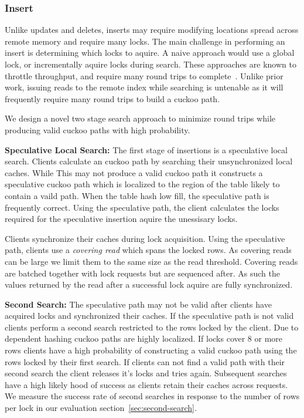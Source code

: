\subsubsection{Insert}

Unlike updates and deletes, inserts may require modifying
locations spread across remote memory and require many
locks. The main challenge in performing an insert is
determining which locks to aquire. A naive approach would
use a global lock, or incrementally aquire locks during
search. These approaches are known to throttle throughput,
and require many round trips to
complete~\cite{cuckoo-improvements}. Unlike prior work,
issuing reads to the remote index while searching is
untenable as it will frequently require many round trips to
build a cuckoo path.

We design a novel two stage search approach to minimize
round trips while producing valid cuckoo paths with high
probability.

\textbf{Speculative Local Search:} The first stage of
insertions is a speculative local search. Clients calculate
an cuckoo path by searching their unsynchronized local
caches. While This may not produce a valid cuckoo path it
constructs a speculative cuckoo path which is localized to
the region of the table likely to contain a vaild path. When
the table hash low fill, the speculative path is frequently
correct. Using the speculative path, the client calculates
the locks required for the speculative insertion aquire the
unessisary locks.

Clients synchronize their caches during lock acquisition.
Using the speculative path, clients use a \textit{covering
read} which spans the locked rows. As covering reads can be
large we limit them to the same size as the read threshold.
Covering reads are batched together with lock requests but
are sequenced after. As such the values returned by the read
after a successful lock aquire are fully synchronized.

\textbf{Second Search:} The speculative path may not be
valid after clients have acquired locks and synchronized
their caches. If the speculative path is not valid clients
perform a second search restricted to the rows locked by the
client. Due to dependent hashing cuckoo paths are highly
localized. If locks cover 8 or more rows clients have a high
probability of constructing a valid cuckoo path using the
rows locked by their first search. If clients can not find a
valid path with their second search the client releases it's
locks and tries again. Subsequent searches have a high
likely hood of success as clients retain their caches across
requests. We measure the success rate of second searches in
response to the number of rows per lock in our evaluation
section~\ref{sec:second-search}.

